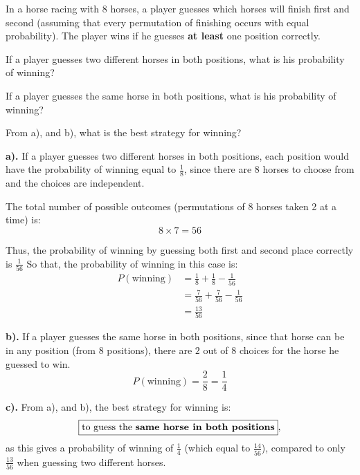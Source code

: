 \documentclass[a4paper, 10pt]{article}
\begin{document}
\begin{problem}
In a horse racing with 8 horses, a player guesses which horses will finish first
and second (assuming that every permutation of finishing occurs with equal probability).
The player wins if he guesses \textbf{at least} one position correctly.
\begin{subproblems_alpha}
	\item If a player guesses two different horses in both positions, what is his probability of winning?
	\item If a player guesses the same horse in both positions, what is his probability of winning?
	\item From a), and b), what is the best strategy for winning?
\end{subproblems_alpha}
\end{problem}

\begin{solution}
	\par\noindent\textbf{a).} If a player guesses two different horses in both positions,
	each position would have the probability of winning equal to \( \frac{1}{8} \),
	since there are 8 horses to choose from and the choices are independent.
	
	\myspace

	\par The total number of possible outcomes (permutations of 8 horses taken 2 at a time) is:
	\[
		8 \times 7 = 56
	\]

	Thus, the probability of winning by guessing both first and second place correctly is \( \frac{1}{56} \)
	So that, the probability of winning in this case is:
	\begin{align*}
		P(\text{winning}) & = \frac{1}{8} + \frac{1}{8} - \frac{1}{56}   \\
		                  & = \frac{7}{56} + \frac{7}{56} - \frac{1}{56} \\
		                  & = \boxed{\frac{13}{56}}
	\end{align*}

	\par\noindent\textbf{b).} If a player guesses the same horse in both positions,
	since that horse can be in any position (from \(8\) positions),
	there are \(2\) out of \(8\) choices for the horse he guessed to win.
	\[
		P(\text{winning}) = \frac{2}{8} = \boxed{\frac{1}{4}}
	\]

	\par\noindent\textbf{c).} From a), and b), the best strategy for winning is:
	\[
		\boxed{\text{to guess the \textbf{same horse in both positions}}},
	\]
	as this gives a probability of winning of \(\frac{1}{4}\) (which equal to \(\frac{14}{56}\)),
	compared to only \(\frac{13}{56}\) when guessing two different horses.
\end{solution}
\end{document}
